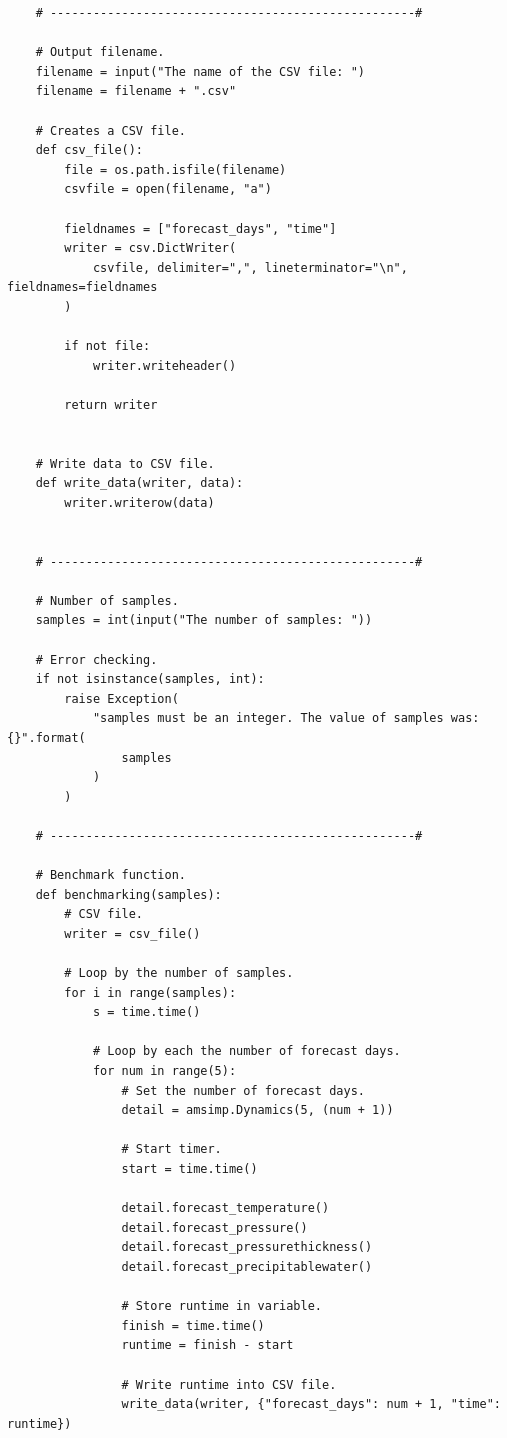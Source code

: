 \begin{appendices}
\begin{verbatim}
    # ---------------------------------------------------#
    
    # Output filename.
    filename = input("The name of the CSV file: ")
    filename = filename + ".csv"
    
    # Creates a CSV file.
    def csv_file():
        file = os.path.isfile(filename)
        csvfile = open(filename, "a")
    
        fieldnames = ["forecast_days", "time"]
        writer = csv.DictWriter(
            csvfile, delimiter=",", lineterminator="\n", fieldnames=fieldnames
        )
    
        if not file:
            writer.writeheader()
    
        return writer
    
    
    # Write data to CSV file.
    def write_data(writer, data):
        writer.writerow(data)
    
    
    # ---------------------------------------------------#
    
    # Number of samples.
    samples = int(input("The number of samples: "))
    
    # Error checking.
    if not isinstance(samples, int):
        raise Exception(
            "samples must be an integer. The value of samples was: {}".format(
                samples
            )
        )
    
    # ---------------------------------------------------#
    
    # Benchmark function.
    def benchmarking(samples):
        # CSV file.
        writer = csv_file()
    
        # Loop by the number of samples.
        for i in range(samples):
            s = time.time()
    
            # Loop by each the number of forecast days.
            for num in range(5):
                # Set the number of forecast days.
                detail = amsimp.Dynamics(5, (num + 1))
    
                # Start timer.
                start = time.time()
    
                detail.forecast_temperature()
                detail.forecast_pressure()
                detail.forecast_pressurethickness()
                detail.forecast_precipitablewater()
    
                # Store runtime in variable.
                finish = time.time()
                runtime = finish - start
    
                # Write runtime into CSV file.
                write_data(writer, {"forecast_days": num + 1, "time": runtime})
    

\end{verbatim}
\end{appendices}
